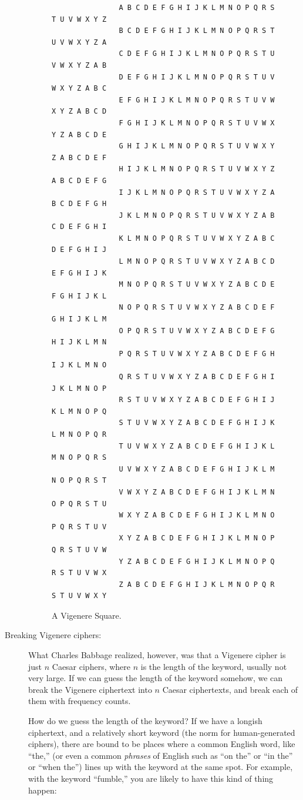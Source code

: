 \documentclass{article}
\begin{document}
\begin{description}
\begin{figure}
{\small
\begin{Verbatim}
                A B C D E F G H I J K L M N O P Q R S T U V W X Y Z
                B C D E F G H I J K L M N O P Q R S T U V W X Y Z A 
                C D E F G H I J K L M N O P Q R S T U V W X Y Z A B 
                D E F G H I J K L M N O P Q R S T U V W X Y Z A B C 
                E F G H I J K L M N O P Q R S T U V W X Y Z A B C D 
                F G H I J K L M N O P Q R S T U V W X Y Z A B C D E 
                G H I J K L M N O P Q R S T U V W X Y Z A B C D E F 
                H I J K L M N O P Q R S T U V W X Y Z A B C D E F G 
                I J K L M N O P Q R S T U V W X Y Z A B C D E F G H 
                J K L M N O P Q R S T U V W X Y Z A B C D E F G H I 
                K L M N O P Q R S T U V W X Y Z A B C D E F G H I J 
                L M N O P Q R S T U V W X Y Z A B C D E F G H I J K 
                M N O P Q R S T U V W X Y Z A B C D E F G H I J K L 
                N O P Q R S T U V W X Y Z A B C D E F G H I J K L M 
                O P Q R S T U V W X Y Z A B C D E F G H I J K L M N 
                P Q R S T U V W X Y Z A B C D E F G H I J K L M N O 
                Q R S T U V W X Y Z A B C D E F G H I J K L M N O P 
                R S T U V W X Y Z A B C D E F G H I J K L M N O P Q 
                S T U V W X Y Z A B C D E F G H I J K L M N O P Q R 
                T U V W X Y Z A B C D E F G H I J K L M N O P Q R S 
                U V W X Y Z A B C D E F G H I J K L M N O P Q R S T 
                V W X Y Z A B C D E F G H I J K L M N O P Q R S T U 
                W X Y Z A B C D E F G H I J K L M N O P Q R S T U V 
                X Y Z A B C D E F G H I J K L M N O P Q R S T U V W 
                Y Z A B C D E F G H I J K L M N O P Q R S T U V W X
                Z A B C D E F G H I J K L M N O P Q R S T U V W X Y
\end{Verbatim}
}      

\caption{A Vigenere Square.}
\label{vigeneresquare}
\end{figure}

\item[Breaking Vigenere ciphers:]  What Charles Babbage realized,
  however, was that a Vigenere cipher is just $n$ Caesar ciphers,
  where $n$ is the length of the keyword, usually not very large.  If
  we can guess the length of the keyword somehow, we can break the
  Vigenere ciphertext into $n$ Caesar ciphertexts, and break each of
  them with frequency counts.  

  How do we guess the length of the keyword?  If we have a longish
  ciphertext, and a relatively short keyword (the norm for
  human-generated ciphers), there are bound to be
  places where a common English word, like ``the,'' (or even a common
  {\em phrases} of English such as ``on the'' or ``in the'' or ``when
  the'') lines up with the keyword at the same spot.  For example,
  with the keyword ``fumble,'' you are likely to have this kind of
  thing happen:


\end{description}
\end{document}
